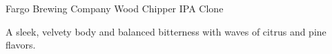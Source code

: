 \begin{recipe}{Fargo Brewing Company Wood Chipper IPA Clone}

\begin{aboutblock}
A sleek, velvety body and balanced bitterness with waves of citrus and pine
flavors. \sourceaha
\end{aboutblock}


\begin{methodandtiming}
 
\begin{mashsteps}
\end{mashsteps}

\end{methodandtiming}

\recipebreak

\begin{ingredientsblock}

\begin{malts}
\end{malts}

\begin{hops}
\end{hops}


\end{ingredientsblock}

\end{recipe}

